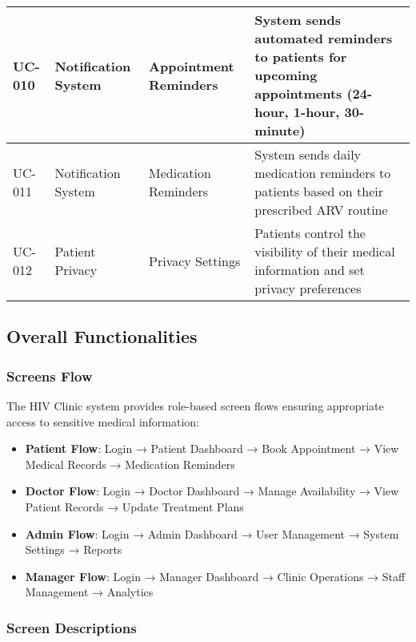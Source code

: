 \documentclass[12pt,a4paper]{article}
\begin{document}
\begin{longtable}{|p{1cm}|p{3cm}|p{3cm}|p{7cm}|}
\hline
UC-010 & Notification System & Appointment Reminders & System sends automated reminders to patients for upcoming appointments (24-hour, 1-hour, 30-minute) \\
\hline
UC-011 & Notification System & Medication Reminders & System sends daily medication reminders to patients based on their prescribed ARV routine \\
\hline
UC-012 & Patient Privacy & Privacy Settings & Patients control the visibility of their medical information and set privacy preferences \\
\hline
\end{longtable}

\subsection{Overall Functionalities}

\subsubsection{Screens Flow}

The HIV Clinic system provides role-based screen flows ensuring appropriate access to sensitive medical information:

\begin{itemize}
    \item \textbf{Patient Flow}: Login → Patient Dashboard → Book Appointment → View Medical Records → Medication Reminders
    \item \textbf{Doctor Flow}: Login → Doctor Dashboard → Manage Availability → View Patient Records → Update Treatment Plans
    \item \textbf{Admin Flow}: Login → Admin Dashboard → User Management → System Settings → Reports
    \item \textbf{Manager Flow}: Login → Manager Dashboard → Clinic Operations → Staff Management → Analytics
\end{itemize}

\subsubsection{Screen Descriptions}
\end{document}

